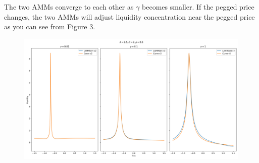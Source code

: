 \documentclass{article}
\begin{document}
The two AMMs converge to each other as $\gamma$ becomes smaller. If the pegged price changes, the two AMMs will adjust liquidity concentration near the pegged price as you can see from Figure 3.

\begin{figure}[H]
    \centering
    \includegraphics[width=1\linewidth]{figure3.png}
    \label{3}
\end{figure}
\end{document}
